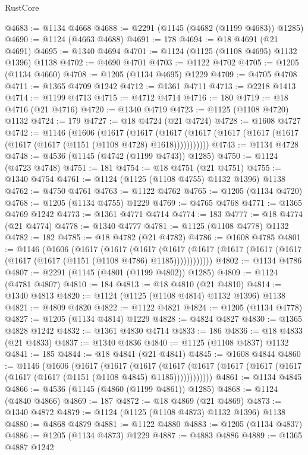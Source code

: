 \begin{lexlean}{RustCore}
\begin{coremodule}
@4683 := @1134 @4668
@4688 := @2291 (@1145 (@4682 (@1199 @4683)) @1285)
@4690 := @1124 (@4663 @4688)
@4691 := 178
@4694 := @18 @4691 (@21 @4691)
@4695 := @1340 @4694
@4701 := @1124 (@1125 (@1108 @4695) @1132 @1396) @1138
@4702 := @4690 @4701
@4703 := @1122 @4702
@4705 := @1205 (@1134 @4660)
@4708 := @1205 (@1134 @4695) @1229
@4709 := @4705 @4708
@4711 := @1365 @4709 @1242
@4712 := @1361 @4711
@4713 := @2218 @1413
@4714 := @1199 @4713
@4715 := @4712 @4714
@4716 := 180
@4719 := @18 @4716 (@21 @4716)
@4720 := @1340 @4719
@4723 := @1125 (@1108 @4720) @1132
@4724 := 179
@4727 := @18 @4724 (@21 @4724)
@4728 := @1608 @4727
@4742 := @1146
    (@1606
      (@1617
        (@1617
          (@1617 (@1617 (@1617 (@1617 (@1617 (@1617 (@1617 (@1151 (@1108 @4728) @1618)))))))))))
@4743 := @1134 @4728
@4748 := @4536 (@1145 (@4742 (@1199 @4743)) @1285)
@4750 := @1124 (@4723 @4748)
@4751 := 181
@4754 := @18 @4751 (@21 @4751)
@4755 := @1340 @4754
@4761 := @1124 (@1125 (@1108 @4755) @1132 @1396) @1138
@4762 := @4750 @4761
@4763 := @1122 @4762
@4765 := @1205 (@1134 @4720)
@4768 := @1205 (@1134 @4755) @1229
@4769 := @4765 @4768
@4771 := @1365 @4769 @1242
@4773 := @1361 @4771 @4714
@4774 := 183
@4777 := @18 @4774 (@21 @4774)
@4778 := @1340 @4777
@4781 := @1125 (@1108 @4778) @1132
@4782 := 182
@4785 := @18 @4782 (@21 @4782)
@4786 := @1608 @4785
@4801 := @1146
    (@1606
      (@1617
        (@1617
          (@1617
            (@1617 (@1617 (@1617 (@1617 (@1617 (@1617 (@1617 (@1151 (@1108 @4786) @1185))))))))))))
@4802 := @1134 @4786
@4807 := @2291 (@1145 (@4801 (@1199 @4802)) @1285)
@4809 := @1124 (@4781 @4807)
@4810 := 184
@4813 := @18 @4810 (@21 @4810)
@4814 := @1340 @4813
@4820 := @1124 (@1125 (@1108 @4814) @1132 @1396) @1138
@4821 := @4809 @4820
@4822 := @1122 @4821
@4824 := @1205 (@1134 @4778)
@4827 := @1205 (@1134 @4814) @1229
@4828 := @4824 @4827
@4830 := @1365 @4828 @1242
@4832 := @1361 @4830 @4714
@4833 := 186
@4836 := @18 @4833 (@21 @4833)
@4837 := @1340 @4836
@4840 := @1125 (@1108 @4837) @1132
@4841 := 185
@4844 := @18 @4841 (@21 @4841)
@4845 := @1608 @4844
@4860 := @1146
    (@1606
      (@1617
        (@1617
          (@1617
            (@1617 (@1617 (@1617 (@1617 (@1617 (@1617 (@1617 (@1151 (@1108 @4845) @1185))))))))))))
@4861 := @1134 @4845
@4866 := @4536 (@1145 (@4860 (@1199 @4861)) @1285)
@4868 := @1124 (@4840 @4866)
@4869 := 187
@4872 := @18 @4869 (@21 @4869)
@4873 := @1340 @4872
@4879 := @1124 (@1125 (@1108 @4873) @1132 @1396) @1138
@4880 := @4868 @4879
@4881 := @1122 @4880
@4883 := @1205 (@1134 @4837)
@4886 := @1205 (@1134 @4873) @1229
@4887 := @4883 @4886
@4889 := @1365 @4887 @1242

\end{coremodule}
\end{lexlean}
